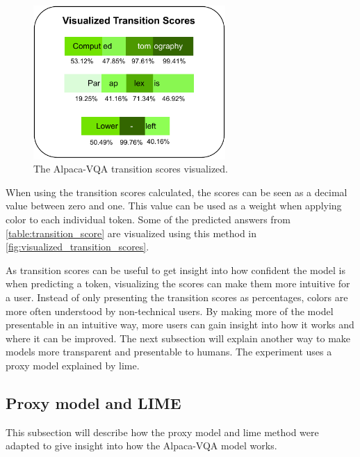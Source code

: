      \begin{figure}[htb]
        \centerline{
        \includegraphics[width=0.65\textwidth]{images/visualized_transition_scores.pdf}}
        \caption{The Alpaca-VQA transition scores visualized.}
        \label{fig:visualized_transition_scores}
    \end{figure} 


    When using the transition scores calculated, the scores can be seen as a decimal value between zero and one. This value can be used as a weight when applying color to each individual token. Some of the predicted answers from \autoref{table:transition_score} are visualized using this method in \autoref{fig:visualized_transition_scores}.

    As transition scores can be useful to get insight into how confident the model is when predicting a token, visualizing the scores can make them more intuitive for a user. Instead of only presenting the transition scores as percentages, colors are more often understood by non-technical users. By making more of the model presentable in an intuitive way, more users can gain insight into how it works and where it can be improved. 
    The next subsection will explain another way to make models more transparent and presentable to humans. The experiment uses a proxy model explained by \gls{lime}. 
    
    
    
    \subsection{Proxy model and LIME}
    \label{sec4:proxy_lime}
    This subsection will describe how the proxy model and \gls{lime} method were adapted to give insight into how the Alpaca-VQA model works.
    
